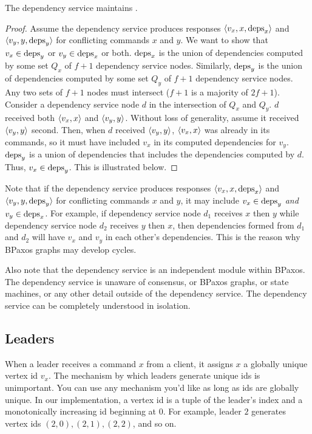 \begin{theorem}
  The dependency service maintains .
\end{theorem}
\begin{proof}
  Assume the dependency service produces responses $\langle v_x, x, \text{deps}_x \rangle$ and
  $\langle v_y, y, \text{deps}_y \rangle$ for conflicting commands $x$ and $y$. We want to
  show that $v_x \in \text{deps}_y$ or $v_y \in \text{deps}_x$ or both. $\text{deps}_x$ is
  the union of dependencies computed by some set $Q_x$ of $f + 1$ dependency
  service nodes. Similarly, $\text{deps}_y$ is the union of dependencies computed
  by some set $Q_y$ of $f + 1$ dependency service nodes. Any two sets of $f +
  1$ nodes must intersect ($f+1$ is a majority of $2f+1$). Consider a
  dependency service node $d$ in the intersection of $Q_x$ and $Q_y$. $d$
  received both $\langle v_x, x \rangle$ and $\langle v_y, y \rangle$. Without loss of generality,
  assume it received $\langle v_y, y \rangle$ second. Then, when $d$ received $\langle v_y,
  y \rangle$, $\langle v_x, x \rangle$ was already in its \textsf{commands}, so it must have
  included $v_x$ in its computed dependencies for $v_y$. $\text{deps}_y$ is a union
  of dependencies that includes the dependencies computed by $d$. Thus, $v_x
  \in \text{deps}_y$. This is illustrated below.

  {}
\end{proof}

Note that if the dependency service produces responses $\langle v_x, x,
\text{deps}_x \rangle$ and $\langle v_y, y, \text{deps}_y \rangle$ for conflicting commands $x$ and $y$,
it may include $v_x \in \text{deps}_y$ \emph{and} $v_y \in \text{deps}_x$. For example,
if dependency service node $d_1$ receives $x$ then $y$ while dependency service
node $d_2$ receives $y$ then $x$, then dependencies formed from $d_1$ and $d_2$
will have $v_x$ and $v_y$ in each other's dependencies. This is the reason why
BPaxos graphs may develop cycles.

Also note that the dependency service is an independent module within BPaxos.
The dependency service is unaware of consensus, or BPaxos graphs, or state
machines, or any other detail outside of the dependency service. The dependency
service can be completely understood in isolation.

\subsection{Leaders}
When a leader receives a command $x$ from a client, it assigns $x$ a globally
unique vertex id $v_x$. The mechanism by which leaders generate unique ids is
unimportant. You can use any mechanism you'd like as long as ids are globally
unique. In our implementation, a vertex id is a tuple of the leader's index and
a monotonically increasing id beginning at $0$. For example, leader $2$
generates vertex ids $(2, 0), (2, 1), (2, 2)$, and so on.

